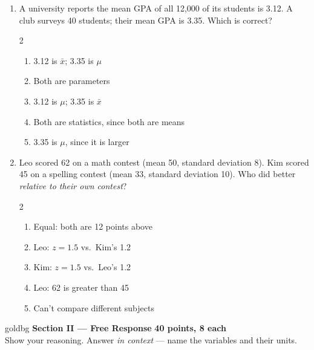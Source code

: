 \documentclass[12pt]{article}
\newenvironment{choices}
  {\begin{enumerate}[label=\textbf{(\Alph*)}, leftmargin=2.2em, itemsep=0pt, topsep=1pt]}
  {\end{enumerate}}
\newcommand{\letterroom}{\rule[-15pt]{0pt}{36pt}}
\begin{document}
\begin{enumerate}[leftmargin=1.9em, itemsep=0.03in]
  \boxguard[10]
  \item A university reports the mean GPA of all 12,000 of its students is 3.12. A club surveys
        40 students; their mean GPA is 3.35. Which is correct?
        \begin{multicols}{2}
        \begin{choices}
          \item 3.12 is $\bar x$; 3.35 is $\mu$
          \item Both are parameters
          \item 3.12 is $\mu$; 3.35 is $\bar x$
          \item Both are statistics, since both are means
          \item 3.35 is $\mu$, since it is larger
                \hfill{}\letterroom
        \end{choices}
        \end{multicols}

  \boxguard[11]
  \item Leo scored 62 on a math contest (mean 50, standard deviation 8). Kim scored 45 on a
        spelling contest (mean 33, standard deviation 10). Who did better \emph{relative to
        their own contest}?
        \begin{multicols}{2}
        \begin{choices}
          \item Equal: both are 12 points above
          \item Leo: $z = 1.5$ vs.\ Kim's 1.2
          \item Kim: $z = 1.5$ vs.\ Leo's 1.2
          \item Leo: 62 is greater than 45
                \hfill{}\letterroom
          \item Can't compare different subjects
        \end{choices}
        \end{multicols}

\end{enumerate}

\vspace{0.08in}

\boxguard[12]
\begin{headlinebox}{goldbg}
\small
\textbf{Section II --- Free Response} \hfill \textbf{40 points, 8 each}\\
Show your reasoning. Answer \emph{in context} --- name the variables and their units.
\end{headlinebox}
\end{document}
